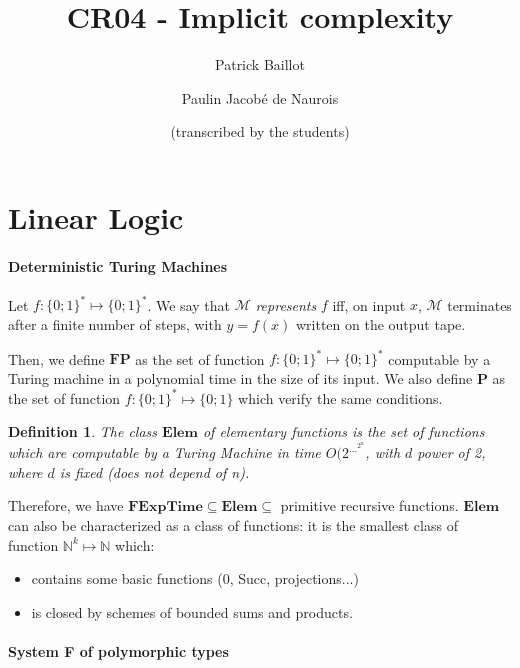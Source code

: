 \documentclass[a4paper,10pt]{article}
\author{Patrick Baillot \and Paulin Jacobé de Naurois \and (transcribed by the students)}
\title{CR04 - Implicit complexity}
\newcommand{\Nset}{\mathbb{N}} %
\newcommand{\Mnice}{\mathcal{M}}			 %
\newcommand{\clFP}{\textbf{FP}}				 %
\newcommand{\clP}{\textbf{P}}				 %
\newcommand{\clElem}{\textbf{Elem}}			 %
\newcommand{\clFExpT}{\textbf{FExpTime}}	 %
\newtheorem{definition}{Definition}
\begin{document}
\maketitle



\part{Linear Logic}

\subsection{Deterministic Turing Machines}

\par Let $f:\{0;1\}^{*} \mapsto \{0;1\}^{*}$. We say that $\Mnice$ \emph{represents} $f$ iff, on input $x$, $\Mnice$ terminates after a finite number of steps, with $y=f(x)$ written on the output tape.

\par Then, we define $\clFP$ as the set of function $f:\{0;1\}^{*} \mapsto \{0;1\}^{*}$ computable by a Turing machine in a polynomial time in the size of its input. We also define $\clP$ as the set of function $f:\{0;1\}^{*} \mapsto \{0;1\}$ which verify the same conditions.

\begin{definition}
The class $\clElem$ of \emph{elementary functions} is the set of functions which are computable by a Turing Machine in time $O(2^{\dots ^{2^n}}$, with $d$ power of 2, where $d$ is fixed (does not depend of n).
\end{definition}

\par Therefore, we have $\clFExpT \subseteq \clElem \subseteq$ primitive recursive functions. $\clElem$ can also be characterized as a class of functions: it is the smallest class of function $\Nset^{k} \mapsto \Nset$ which:
\begin{itemize}
\item contains some basic functions (0, Succ, projections...)
\item is closed by schemes of bounded sums and products.
\end{itemize}



\subsection{System F of polymorphic types}
\end{document}
